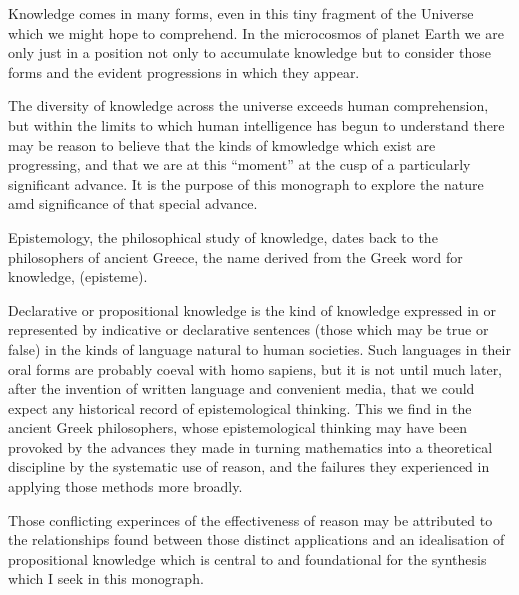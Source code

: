 ﻿
Knowledge comes in many forms, even in this tiny fragment of the Universe which we might hope to comprehend.
In the microcosmos of planet Earth we are only just in a position not only to accumulate knowledge but to consider those forms and the evident progressions in which they appear.

The diversity of knowledge across the universe exceeds human comprehension, but within the limits to which human intelligence has begun to understand there may be reason to believe that the kinds of kmowledge which exist are progressing, and that we are at this ``moment'' at the cusp of a particularly significant advance.
It is the purpose of this monograph to explore the nature amd significance of that special advance.

Epistemology, the philosophical study of knowledge, dates back to the phi\-lo\-so\-phers of ancient Greece, the name derived from the Greek word for knowledge,  (episteme).

Declarative or propositional knowledge is the kind of knowledge expressed in or represented by indicative or declarative sentences (those which may be true or false) in the kinds of language natural to human societies.
Such languages in their oral forms are probably coeval with homo sapiens, but it is not until much later, after the invention of written language and convenient media, that we could expect any historical record of epistemological thinking.
This we find in the ancient Greek philosophers, whose epistemological thinking may have been provoked by the advances they made in turning mathematics into a theoretical discipline by the systematic use of reason, and the failures they experienced in applying those methods more broadly.

Those conflicting experinces of the effectiveness of reason may be attributed to the relationships found between those distinct applications and an idealisation of propositional knowledge which is central to and foundational for the synthesis which I seek in this monograph.

